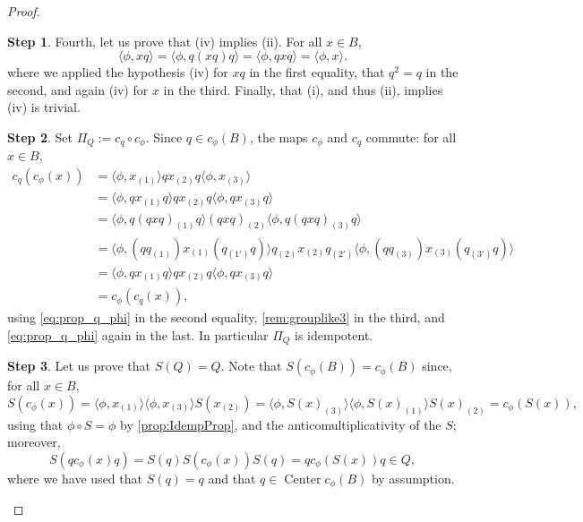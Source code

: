 \documentclass[a4paper,10pt]{amsart}
\newcommand{\eval}[2]{\langle #1 , #2\rangle}
\theoremstyle{definition}
\newtheorem{step-hypergroup}{Step}
\begin{document}
\begin{proof}
\begin{step-hypergroup}
\smallbreak\noindent%
Fourth, let us prove that (iv) implies (ii). For all $x\in B$, 
\[
    \eval{\phi}{xq} = \eval{\phi}{q(xq)q} = \eval{\phi}{qxq} = \eval{\phi}{x}.
\]
where we applied the hypothesis (iv) for $xq$ in the first equality, that $q^2 = q$ in the second, and again (iv) for $x$ in the third. Finally, that (i), and thus (ii), implies (iv) is trivial. 
\end{step-hypergroup}
\begin{step-hypergroup}\label{stepHypergroupPi}
    Set
    $\Pi_Q := c_q \circ c_\phi$. Since $q \in c_\phi(B)$, the maps $c_\phi$ and $c_q$ commute:
    for all $x\in B$,
    \begin{align*}
        c_q(c_\phi(x))
        &=
        \eval{\phi}{x_{(1)}}  q x_{(2)} q \eval{\phi}{x_{(3)}}
        \\
        &=
        \eval{\phi}{q x_{(1)} q} q x_{(2)} q \eval{\phi}{q x_{(3)} q}
        \\
        &=
        \eval{\phi}{q (qxq)_{(1)} q} (qxq)_{(2)} \eval{\phi}{q (qxq)_{(3)} q}
        \\
        &=
        \eval{\phi}{(q q_{(1)}) x_{(1)} (q_{(1')} q)} q_{(2)} x_{(2)} q_{(2')} \eval{\phi}{(q q_{(3)})x_{(3)} (q_{(3')} q)}
        \\
        &=
        \eval{\phi}{q x_{(1)} q} q x_{(2)} q \eval{\phi}{q x_{(3)} q}
        \\
        &=
        c_\phi(c_q(x)),
    \end{align*}
    using \cref{eq:prop_q_phi} in the second equality, \cref{rem:grouplike3} in the third,
    and \cref{eq:prop_q_phi} again in the last. In particular $\Pi_Q$ is idempotent.
\end{step-hypergroup}
\begin{step-hypergroup}
    Let us prove that $S(Q) = Q$.
    Note that $S(c_\phi(B))=c_\phi(B)$ since, for all $x\in B$,
    \[
        S ( c_\phi(x) )
        =
        \eval{\phi}{x_{(1)}} \eval{\phi}{x_{(3)}} S(x_{(2)})
        =
        \eval{\phi}{S(x)_{(3)}} \eval{\phi}{S(x)_{(1)}} S(x)_{(2)}
        =
        c_\phi(S(x)),
    \]
using that $\phi\circ S=\phi$ by \cref{prop:IdempProp}, and the anticomultiplicativity of the $S$; moreover,
    \[
        S(q  c_\phi(x) q )
        =
        S(q) S( c_\phi(x) ) S(q)
        =
        q c_\phi( S(x) ) q
        \in Q,
    \]
where we have used that $S(q)=q$ and that $q \in \operatorname{Center}c_\phi(B)$ by assumption.

\end{step-hypergroup}
\end{proof}
\end{document}
